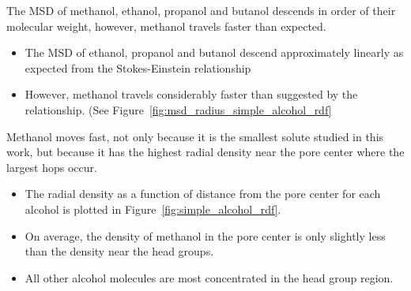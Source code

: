 \documentclass{article}
\begin{document}
  The MSD of methanol, ethanol, propanol and butanol descends in order of 
  their molecular weight, however, methanol travels faster than expected.  %
  \begin{itemize}
    \item The MSD of ethanol, propanol and butanol descend approximately
    linearly as expected from the Stokes-Einstein relationship  %
    \item However, methanol travels considerably faster than suggested by the
    relationship. (See Figure~\ref{fig:msd_radius_simple_alcohol_rdf}
  \end{itemize}    
    
  Methanol moves fast, not only because it is the smallest solute studied in this work, but
  because it has the highest radial density near the pore center where the largest hops occur.
  \begin{itemize}
    \item The radial density as a function of distance from the pore center
    for each alcohol is plotted in Figure~\ref{fig:simple_alcohol_rdf}.
    \item On average, the density of methanol in the pore center is only slightly
    less than the density near the head groups.
    \item All other alcohol molecules are most concentrated in the head group region.
  \end{itemize}
  
\end{document}
